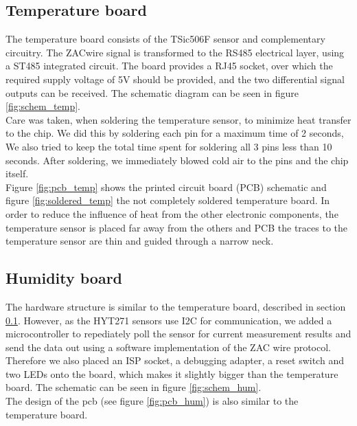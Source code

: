 \documentclass[a4paper]{scrreprt}
\begin{document}
\subsection{Temperature board} \label{chap:tempbrd}
The temperature board consists of the TSic506F sensor and
complementary circuitry. The ZACwire signal is transformed to the
RS485 electrical layer, using a ST485 integrated circuit. The board
provides a RJ45 socket,  over which the required supply voltage of 5V
should be provided, and the two differential signal outputs can be
received. The schematic diagram can be seen in figure
\ref{fig:schem_temp}.\\
Care was taken, when soldering the temperature sensor, to minimize
heat transfer to the chip. We did this by soldering each pin for a
maximum time of 2 seconds, We also tried to keep the total time spent
for soldering all 3 pins less than 10 seconds. After soldering, we
immediately blowed cold air to the pins and the chip itself.\\
Figure \ref{fig:pcb_temp} shows the printed circuit board (PCB) schematic
and figure \ref{fig:soldered_temp} the not completely soldered
temperature board. 
In order to reduce the influence of heat from the other electronic
components, the temperature sensor is placed far away from the others
and PCB the traces to the temperature sensor are thin and guided through
a narrow neck.
\subsection{Humidity board}
The hardware structure is similar to the temperature board, described in section \ref{chap:tempbrd}. However, as the HYT271 sensors use I2C for
communication, we added a microcontroller to repediately poll the sensor for current measurement results and send the data out using a software
implementation of the ZAC wire protocol. Therefore we also placed an ISP socket, a debugging adapter, a reset switch and two LEDs onto the board, which makes it
slightly bigger than the temperature board. The schematic can be seen in figure \ref{fig:schem_hum}.\\
The design of the pcb (see figure \ref{fig:pcb_hum}) is also similar to the temperature board. 
\end{document}
